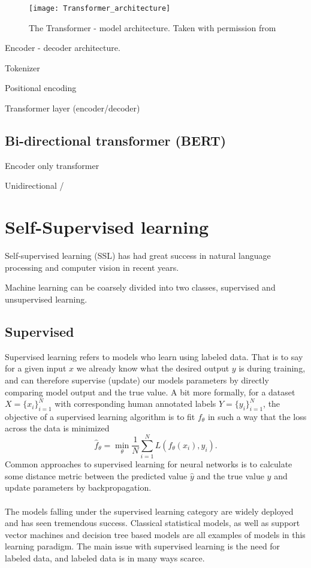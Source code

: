 \documentclass[../../thesis.tex]{subfiles}
\begin{document}
\begin{figure}[h]
    \texttt{[image: Transformer\_architecture]}
    \centering 
    \label{fig:transfomrer}
    \caption{The Transformer - model architecture. Taken with permission from \cite{vaswani2023attention}}
\end{figure}




Encoder - decoder architecture. 

Tokenizer

Positional encoding


Transformer layer (encoder/decoder)

\subsection{Bi-directional transformer (BERT)}

Encoder only transformer



Unidirectional / 



\section{Self-Supervised learning}

Self-supervised learning (SSL) has had great success in natural language processing and computer vision in recent years. 

Machine learning can be coarsely divided into two classes, supervised and unsupervised learning. 

\subsection{Supervised}
Supervised learning refers to models who learn using labeled data. That is to say for a given input $x$ we already know what the desired output $y$ is during training, and can therefore supervise (update) our models parameters by directly comparing model output and the true value. A bit more formally, for a dataset $X = \{x_i\}_{i=1}^N$ with corresponding human annotated labels $Y = \{y_i\}_{i=1}^N$, the objective of a supervised learning algorithm is to fit $f_\theta$ in such a way that the loss across the data is minimized
\begin{equation}
    \widehat{f}_\theta = \min_\theta \frac{1}{N} \sum_{i=1}^N L(f_\theta(x_i),y_i).
\end{equation}
Common approaches to supervised learning for neural networks is to calculate some distance metric between the predicted value $\widehat{y}$ and the true value $y$ and update parameters by backpropagation.\\\\
The models falling under the supervised learning category are widely deployed and has seen tremendous success. Classical statistical models, as well as support vector machines and decision tree based models are all examples of models in this learning paradigm. The main issue with supervised learning is the need for labeled data, and labeled data is in many ways scarce.
\end{document}
